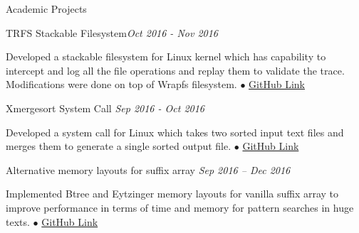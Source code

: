 \documentclass{resume} %
\begin{document}
\begin{rSection}{Academic Projects}

\begin{rSubsection}{TRFS Stackable Filesystem}{\emph{Oct 2016 - Nov 2016}}{}{}
\item Developed a stackable filesystem for Linux kernel which has capability to intercept and log all the file operations and replay them to validate the trace. Modifications were done on top of Wrapfs filesystem.
{\tiny$\bullet$}
\href{https://github.com/t-lohani/TRFS-Stackable-Filesystem}{GitHub Link}
\end{rSubsection}


\begin{rSubsection}{Xmergesort System Call} {\emph {Sep 2016 - Oct 2016}}{}{}
\item Developed a system call for Linux which takes two sorted input text files and merges them to generate a single sorted output file.
{\tiny$\bullet$}     
\href{https://github.com/t-lohani/Xmergesort-System-Call}{GitHub Link}
\end{rSubsection}


\begin{rSubsection}{Alternative memory layouts for suffix array} {\emph {Sep 2016 -- Dec 2016}}{}{}
\item Implemented Btree and Eytzinger memory layouts for vanilla suffix array to improve performance in terms of time and memory for pattern searches in huge texts.
{\tiny$\bullet$}
\href{https://github.com/t-lohani/Suffixarray-Layout}{GitHub Link} 
\end{rSubsection}




\end{rSection}
\end{document}
